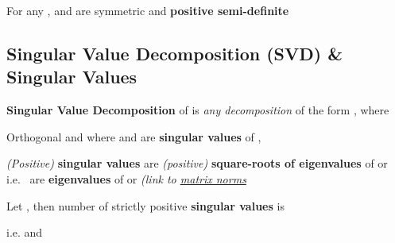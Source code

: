 \hSep %

For any ,  and
 are symmetric and \textbf{positive semi-definite}

\subsection*{Singular Value Decomposition (SVD) \& Singular Values}


\textbf{Singular Value Decomposition} of
 is \emph{any decomposition} of
the form , where

\begin{itemize}

      \vItem
            Orthogonal 
            and 
      \vItem
            where  and
            \tcbbreak
      \vItem
             are \textbf{singular values}
            of ,

            \begin{itemize}

                  \vItem
                        \emph{(Positive)} \textbf{singular values} are \emph{(positive)}
                        \textbf{square-roots of eigenvalues} of  or
                  \vItem
                        i.e.~ are
                        \textbf{eigenvalues} of  or 
                  \vItem
                         \emph{(link to
                              \underline{matrix norms}}
            \end{itemize}
\end{itemize}

Let , then number of strictly positive
\textbf{singular values} is 

\begin{itemize}

      \vItem
            i.e.  and
      \vItem
\end{itemize}

